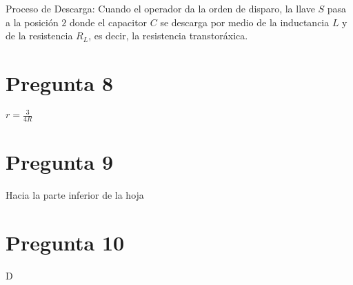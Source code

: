 \documentclass{exam}
\begin{document}
    Proceso de Descarga: Cuando el operador da la orden de disparo, la llave $S$ pasa a la posición  
    $2$ donde el capacitor $C$ se descarga por medio de la inductancia $L$ y de la resistencia 
    $R_L$, es decir, la resistencia transtoráxica.

    \section*{Pregunta 8}

    $r=\frac{3}{4R}$



    \section*{Pregunta 9}

    Hacia la parte inferior de la hoja

    \section*{Pregunta 10}

    D
\end{document}
